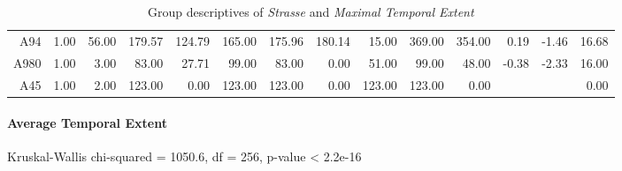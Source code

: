 \begin{table}[ht!]
\begin{tabular}{rrrrrrrrrrrrrr}
    A94  & 1.00 & 56.00 & 179.57 & 124.79 & 165.00 & 175.96 & 180.14 & 15.00 & 369.00 & 354.00 & 0.19 & -1.46 & 16.68 \\ 
    A980 & 1.00 & 3.00 & 83.00 & 27.71 & 99.00 & 83.00 & 0.00 & 51.00 & 99.00 & 48.00 & -0.38 & -2.33 & 16.00 \\ 
    A45  & 1.00 & 2.00 & 123.00 & 0.00 & 123.00 & 123.00 & 0.00 & 123.00 & 123.00 & 0.00 &  &  & 0.00 \\ 
    \bottomrule
  \end{tabular}
	\caption{Group descriptives of \textit{Strasse} and \textit{Maximal Temporal Extent}}
	\label{tbl:descriptives_baysis_matched_Strasse_TMax}
\end{table}


\paragraph{Average Temporal Extent}
Kruskal-Wallis chi-squared = 1050.6, df = 256, p-value < 2.2e-16

